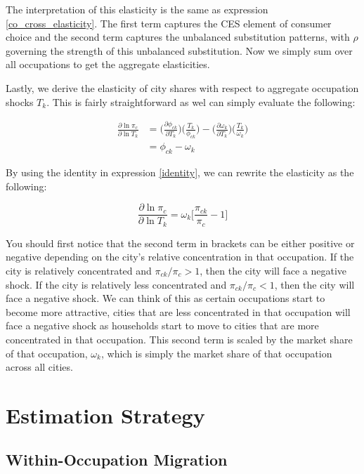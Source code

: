 \documentclass[10pt]{article}
\begin{document}
The interpretation of this elasticity is the same as expression \ref{co_cross_elasticity}. The first term captures the CES element of consumer choice and the second term captures the unbalanced substitution patterns, with $\rho$ governing the strength of this unbalanced substitution. Now we simply sum over all occupations to get the aggregate elasticities.

Lastly, we derive the elasticity of city shares with respect to aggregate occupation shocks $T_k$. This is fairly straightforward as wel can simply evaluate the following:

\begin{align*}
    \frac{\partial\ln{\pi_{c}}}{\partial\ln{T_{k}}} & = \Big(\frac{\partial{\phi_{ck}}}{\partial{T_{k}}}\Big)\Big(\frac{T_{k}}{\phi_{ck}}\Big) - \Big(\frac{\partial{\omega_{k}}}{\partial{T_{k}}}\Big)\Big(\frac{T_{k}}{\omega_{k}}\Big) \\ &= \phi_{ck}-\omega_{k}
\end{align*}

By using the identity in expression \ref{identity}, we can rewrite the elasticity as the following:

\begin{equation}
    \frac{\partial\ln{\pi_{c}}}{\partial\ln{T_{k}}} = {\omega_{k}}\Bigg[\frac{\pi_{ck}}{\pi_{c}}-1\Bigg]
    \label{city_occupation_elasticity}
\end{equation}

You should first notice that the second term in brackets can be either positive or negative depending on the city's relative concentration in that occupation. If the city is relatively concentrated and $\pi_{ck} / \pi_c > 1$, then the city will face a negative shock. If the city is relatively less concentrated and $\pi_{ck} / \pi_c < 1$, then the city will face a negative shock. We can think of this as certain occupations start to become more attractive, cities that are less concentrated in that occupation will face a negative shock as households start to move to cities that are more concentrated in that occupation. This second term is scaled by the market share of that occupation, $\omega_k$, which is simply the market share of that occupation across all cities.

\section{Estimation Strategy}

\subsection{Within-Occupation Migration}
\end{document}
